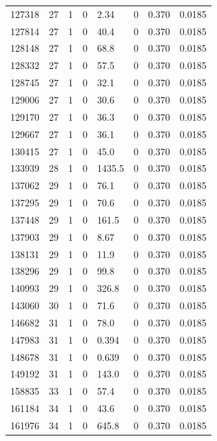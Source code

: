 \documentclass[preview]{standalone}
\begin{document}
{{{{{{{{{{{{\begin{tabular}{L{1.2cm}C{1.2cm} C{0.3cm}C{0.5cm} C{1.4cm}C{1.4cm} C{1.4cm}C{1.4cm}}
  127318  &    27  & 1     &  0 &  2.34  & 0  & 0.370 &  0.0185   \\ 
  127814  &    27  & 1     &  0 &  40.4  & 0  & 0.370 &  0.0185   \\ 
  128148  &    27  & 1     &  0 &  68.8  & 0  & 0.370 &  0.0185   \\ 
  128332  &    27  & 1     &  0 &  57.5  & 0  & 0.370 &  0.0185   \\ 
  128745  &    27  & 1     &  0 &  32.1  & 0  & 0.370 &  0.0185   \\ 
  129006  &    27  & 1     &  0 &  30.6  & 0  & 0.370 &  0.0185   \\ 
  129170  &    27  & 1     &  0 &  36.3  & 0  & 0.370 &  0.0185   \\ 
  129667  &    27  & 1     &  0 &  36.1  & 0  & 0.370 &  0.0185   \\ 
  130415  &    27  & 1     &  0 &  45.0  & 0  & 0.370 &  0.0185   \\ 
  133939  &    28  & 1     &  0 &  1435.5  & 0  & 0.370 &  0.0185   \\ 
  137062  &    29  & 1     &  0 &  76.1  & 0  & 0.370 &  0.0185   \\ 
  137295  &    29  & 1     &  0 &  70.6  & 0  & 0.370 &  0.0185   \\ 
  137448  &    29  & 1     &  0 &  161.5  & 0  & 0.370 &  0.0185   \\ 
  137903  &    29  & 1     &  0 &  8.67  & 0  & 0.370 &  0.0185   \\ 
  138131  &    29  & 1     &  0 &  11.9  & 0  & 0.370 &  0.0185   \\ 
  138296  &    29  & 1     &  0 &  99.8  & 0  & 0.370 &  0.0185   \\ 
  140993  &    29  & 1     &  0 &  326.8  & 0  & 0.370 &  0.0185   \\ 
  143060  &    30  & 1     &  0 &  71.6  & 0  & 0.370 &  0.0185   \\ 
  146682  &    31  & 1     &  0 &  78.0  & 0  & 0.370 &  0.0185   \\ 
  147983  &    31  & 1     &  0 &  0.394  & 0  & 0.370 &  0.0185   \\ 
  148678  &    31  & 1     &  0 &  0.639  & 0  & 0.370 &  0.0185   \\ 
  149192  &    31  & 1     &  0 &  143.0  & 0  & 0.370 &  0.0185   \\ 
  158835  &    33  & 1     &  0 &  57.4  & 0  & 0.370 &  0.0185   \\ 
  161184  &    34  & 1     &  0 &  43.6  & 0  & 0.370 &  0.0185   \\ 
  161976  &    34  & 1     &  0 &  645.8  & 0  & 0.370 &  0.0185   \\ 
\hline 
\end{tabular} 

}}}}}}}}}}}}
\end{document}
